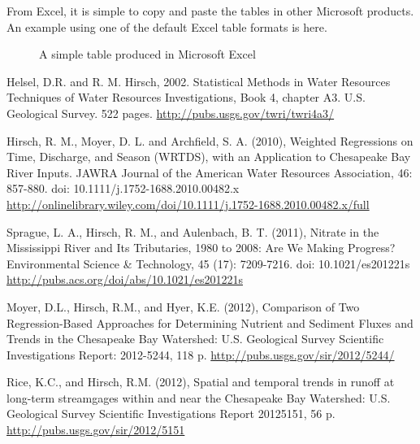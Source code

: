 \documentclass[a4paper,11pt]{article}\usepackage{graphicx, color}
\begin{document}
From Excel, it is simple to copy and paste the tables in other Microsoft products. An example using one of the default Excel table formats is here.

\begin{figure}[ht!]
\centering
\caption{A simple table produced in Microsoft Excel}
\label{overflow}
\end{figure}



\clearpage
\begin{thebibliography}{10}

Helsel, D.R. and R. M. Hirsch, 2002. Statistical Methods in Water Resources Techniques of Water Resources Investigations, Book 4, chapter A3. U.S. Geological Survey. 522 pages. \url{http://pubs.usgs.gov/twri/twri4a3/}

Hirsch, R. M., Moyer, D. L. and Archfield, S. A. (2010), Weighted Regressions on Time, Discharge, and Season (WRTDS), with an Application to Chesapeake Bay River Inputs. JAWRA Journal of the American Water Resources Association, 46: 857-880. doi: 10.1111/j.1752-1688.2010.00482.x \url{http://onlinelibrary.wiley.com/doi/10.1111/j.1752-1688.2010.00482.x/full}

Sprague, L. A., Hirsch, R. M., and Aulenbach, B. T. (2011), Nitrate in the Mississippi River and Its Tributaries, 1980 to 2008: Are We Making Progress? Environmental Science \& Technology, 45 (17): 7209-7216. doi: 10.1021/es201221s \url{http://pubs.acs.org/doi/abs/10.1021/es201221s}

Moyer, D.L., Hirsch, R.M., and Hyer, K.E. (2012), Comparison of Two Regression-Based Approaches for Determining Nutrient and Sediment Fluxes and Trends in the Chesapeake Bay Watershed: U.S. Geological Survey Scientific Investigations Report: 2012-5244, 118 p. \url{http://pubs.usgs.gov/sir/2012/5244/}

Rice, K.C., and Hirsch, R.M. (2012), Spatial and temporal trends in runoff at long-term streamgages within and near the Chesapeake Bay Watershed: U.S. Geological Survey Scientific Investigations Report 20125151, 56 p. \url{http://pubs.usgs.gov/sir/2012/5151}


\end{thebibliography}
\end{document}
